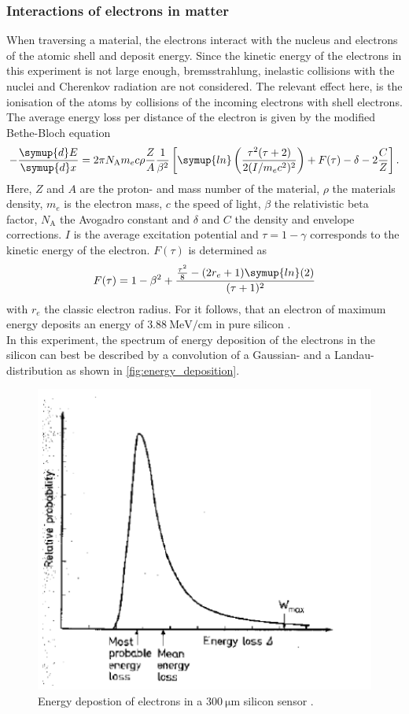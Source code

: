 \subsubsection{Interactions of electrons in matter}
\label{sec:therory_interactions}
When traversing a material, the electrons interact with the nucleus and electrons of the atomic shell and deposit energy. Since the kinetic energy of the electrons in this experiment
is not large enough, bremsstrahlung, inelastic collisions with the nuclei and Cherenkov radiation are not considered. The relevant effect here, is the ionisation of the atoms by 
collisions of the incoming electrons with shell electrons. The average energy loss per distance of the electron is given by the modified Bethe-Bloch equation \cite{Leo1987}
\begin{equation}
    -\frac{\symup{d}E}{\symup{d}x} = 2 \mathrm{\pi} N_\text{A} m_e c \rho \frac{Z}{A} \frac{1}{\beta^2}
    \left[ \symup{ln}\left(\frac{\tau^2(\tau +2)}{2(I/m_ec^2)^2}\right) + F(\tau) -\delta -2 \frac{C}{Z}\right].
    \label{eq:bethe_bloch}
\end{equation}
Here, $Z$ and $A$ are the proton- and mass number of the material, $\rho$ the materials density, $m_e$ is the electron mass, $c$ the speed of light, 
$\beta$ the relativistic beta factor, $N_\text{A}$ the Avogadro constant and $\delta$ and $C$ the density and envelope corrections. $I$ is the average excitation potential and 
$\tau = 1 - \gamma$ corresponds to the kinetic energy of the electron. $F(\tau)$ is determined as
\begin{equation*}
    F(\tau) = 1-\beta^2 + \frac{\frac{\tau^2}{8}- (2r_e + 1)\symup{ln}(2)}{(\tau+1)^2}
\end{equation*}
with $r_e$ the classic electron radius. For  it follows, that an electron of maximum energy deposits an energy of $\qty{3.88}{\mega\eV\per\cm}$ in pure 
silicon \cite{SiliconStrip}. \\
In this experiment, the spectrum of energy deposition of the electrons in the silicon can best be described by a convolution of a Gaussian- and a Landau- distribution as shown
in \autoref{fig:energy_deposition}.
\begin{figure}
    \centering 
    \includegraphics[width = .5\textwidth]{content/pics/energy_deposition.png}
    \caption{Energy depostion of electrons in a $\qty{300}{\micro\meter}$ silicon sensor \cite{SiliconStrip}.}
    \label{fig:energy_deposition}
\end{figure}

